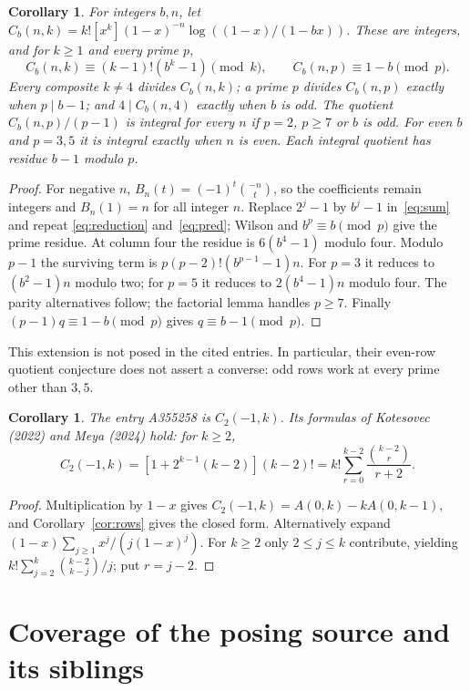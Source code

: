 \documentclass[11pt]{article}
\newtheorem{corollary}[theorem]{Corollary}
\begin{document}
\begin{corollary}\label{cor:extension}
For integers $b,n$, let
$C_b(n,k)=k![x^k](1-x)^{-n}\log((1-x)/(1-bx))$.
These are integers, and for $k\geq1$ and every prime $p$,
\[
 C_b(n,k)\equiv(k-1)!(b^k-1)\pmod k,\qquad
 C_b(n,p)\equiv1-b\pmod p.
\]
Every composite $k\ne4$ divides $C_b(n,k)$; a prime $p$ divides
$C_b(n,p)$ exactly when $p\mid b-1$; and $4\mid C_b(n,4)$
exactly when $b$ is odd.
The quotient $C_b(n,p)/(p-1)$ is integral for every $n$ if
$p=2$, $p\geq7$ or $b$ is odd. For even $b$ and $p=3,5$ it is
integral exactly when $n$ is even. Each integral quotient has
residue $b-1$ modulo $p$.
\end{corollary}
\begin{proof}
For negative $n$, $B_n(t)=(-1)^t\binom{-n}{t}$, so the
coefficients remain integers and $B_n(1)=n$ for all integer $n$.
Replace $2^j-1$ by $b^j-1$ in~\eqref{eq:sum} and repeat
\eqref{eq:reduction} and~\eqref{eq:pred}; Wilson and
$b^p\equiv b\pmod p$ give the prime residue. At column four the
residue is $6(b^4-1)$ modulo four. Modulo $p-1$ the surviving
term is $p(p-2)!(b^{p-1}-1)n$.
For $p=3$ it reduces to $(b^2-1)n$ modulo two;
for $p=5$ it reduces to $2(b^4-1)n$ modulo four.
The parity alternatives follow; the factorial lemma handles $p\geq7$.
Finally $(p-1)q\equiv1-b\pmod p$ gives $q\equiv b-1\pmod p$.
\end{proof}
This extension is not posed in the cited entries. In particular, their
even-row quotient conjecture does not assert a converse: odd rows
work at every prime other than $3,5$.

\begin{corollary}\label{cor:negative}
The entry A355258 is $C_2(-1,k)$. Its formulas of Kotesovec (2022)
and Meya (2024) hold: for $k\geq2$,
\[
 C_2(-1,k)=[1+2^{k-1}(k-2)](k-2)!
 =k!\sum_{r=0}^{k-2}\frac{\binom{k-2}{r}}{r+2}.
\]
\end{corollary}
\begin{proof}
Multiplication by $1-x$ gives
$C_2(-1,k)=A(0,k)-kA(0,k-1)$, and Corollary~\ref{cor:rows}
gives the closed form. Alternatively expand
$(1-x)\sum_{j\geq1}x^j/(j(1-x)^j)$.
For $k\geq2$ only $2\leq j\leq k$ contribute, yielding
$k!\sum_{j=2}^k\binom{k-2}{k-j}/j$; put $r=j-2$.
\end{proof}

\section{Coverage of the posing source and its siblings}
\end{document}
